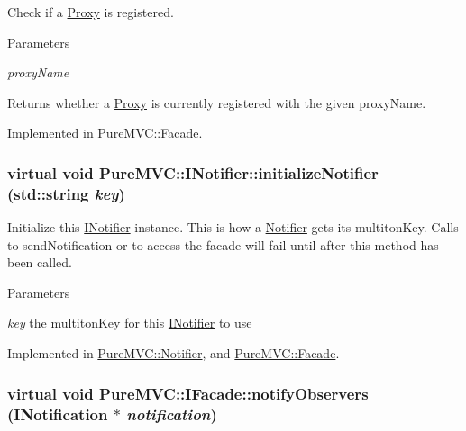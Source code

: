 Check if a \hyperlink{class_pure_m_v_c_1_1_proxy}{Proxy} is registered. 
\begin{DoxyParams}{Parameters}
\item[{\em proxyName}]\end{DoxyParams}
\begin{DoxyReturn}{Returns}
whether a \hyperlink{class_pure_m_v_c_1_1_proxy}{Proxy} is currently registered with the given {\ttfamily proxyName}. 
\end{DoxyReturn}


Implemented in \hyperlink{class_pure_m_v_c_1_1_facade_aaeac78a5ffe3d7da658761287bdccb1e}{PureMVC::Facade}.\hypertarget{class_pure_m_v_c_1_1_i_notifier_a28d7dbbe0726d4d52080546c5d79b232}{
\subsubsection[{initializeNotifier}]{\setlength{\rightskip}{0pt plus 5cm}virtual void PureMVC::INotifier::initializeNotifier (std::string {\em key})}}
\label{class_pure_m_v_c_1_1_i_notifier_a28d7dbbe0726d4d52080546c5d79b232}


Initialize this \hyperlink{class_pure_m_v_c_1_1_i_notifier}{INotifier} instance. This is how a \hyperlink{class_pure_m_v_c_1_1_notifier}{Notifier} gets its multitonKey. Calls to sendNotification or to access the facade will fail until after this method has been called.


\begin{DoxyParams}{Parameters}
\item[{\em key}]the multitonKey for this \hyperlink{class_pure_m_v_c_1_1_i_notifier}{INotifier} to use \end{DoxyParams}


Implemented in \hyperlink{class_pure_m_v_c_1_1_notifier_a6910365c70415ba7973401215f57e4af}{PureMVC::Notifier}, and \hyperlink{class_pure_m_v_c_1_1_facade_a94c72ff29f9f42ff084f247b180fb4ad}{PureMVC::Facade}.\hypertarget{class_pure_m_v_c_1_1_i_facade_acd9023ead1da9b309b3e85406cbc428b}{
\subsubsection[{notifyObservers}]{\setlength{\rightskip}{0pt plus 5cm}virtual void PureMVC::IFacade::notifyObservers ({\bf INotification} $\ast$ {\em notification})}}
\label{class_pure_m_v_c_1_1_i_facade_acd9023ead1da9b309b3e85406cbc428b}


